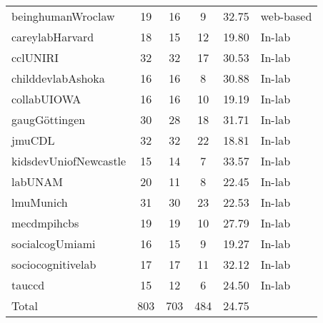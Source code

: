 \documentclass[
  man,floatsintext]{apa6}
\begin{document}
\begin{center}
\begin{ThreePartTable}
{\begin{longtable}{lccccl}
beinghumanWroclaw & 19 & 16 & 9 & 32.75 & web-based\\
careylabHarvard & 18 & 15 & 12 & 19.80 & In-lab\\
cclUNIRI & 32 & 32 & 17 & 30.53 & In-lab\\
childdevlabAshoka & 16 & 16 & 8 & 30.88 & In-lab\\
collabUIOWA & 16 & 16 & 10 & 19.19 & In-lab\\
gaugGöttingen & 30 & 28 & 18 & 31.71 & In-lab\\
jmuCDL & 32 & 32 & 22 & 18.81 & In-lab\\
kidsdevUniofNewcastle & 15 & 14 & 7 & 33.57 & In-lab\\
labUNAM & 20 & 11 & 8 & 22.45 & In-lab\\
lmuMunich & 31 & 30 & 23 & 22.53 & In-lab\\
mecdmpihcbs & 19 & 19 & 10 & 27.79 & In-lab\\
socialcogUmiami & 16 & 15 & 9 & 19.27 & In-lab\\
sociocognitivelab & 17 & 17 & 11 & 32.12 & In-lab\\
tauccd & 15 & 12 & 6 & 24.50 & In-lab\\
Total & 803 & 703 & 484 & 24.75 & \\
\bottomrule
\end{longtable}

}

\end{ThreePartTable}
\end{center}
\end{document}
